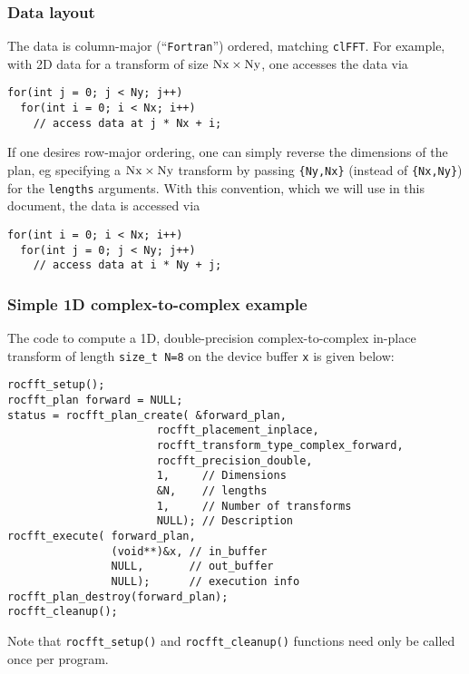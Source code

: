 \documentclass[10pt]{article}
\renewcommand{\(}{\left(}
\renewcommand{\)}{\right)}
\begin{document}
\subsubsection{Data layout}
\label{ssdatalayout}
The data is column-major (``\texttt{Fortran}'') ordered, matching
\texttt{clFFT}.  For example, with 2D data for a transform of size
$\text{\lstinline{Nx}}\times\text{\lstinline{Ny}}$, one accesses the
data via
\begin{lstlisting}
for(int j = 0; j < Ny; j++)
  for(int i = 0; i < Nx; i++)
    // access data at j * Nx + i;
\end{lstlisting}
If one desires row-major ordering, one can simply reverse the
dimensions of the plan, eg specifying a
$\text{\lstinline{Nx}}\times\text{\lstinline{Ny}}$ transform by
passing \lstinline|{Ny,Nx}| (instead of \lstinline|{Nx,Ny}|) for the
\lstinline|lengths| arguments.  With this convention, which we will
use in this document, the data is accessed via 
\begin{lstlisting}
for(int i = 0; i < Nx; i++)
  for(int j = 0; j < Ny; j++)
    // access data at i * Ny + j;
\end{lstlisting}

\subsubsection{Simple 1D complex-to-complex example}
The code to compute a 1D, double-precision complex-to-complex in-place
transform of length \lstinline{size_t N=8} on the device buffer
\lstinline{x} is given below:
\begin{lstlisting}
rocfft_setup();
rocfft_plan forward = NULL;
status = rocfft_plan_create( &forward_plan,
                       rocfft_placement_inplace,
                       rocfft_transform_type_complex_forward,
                       rocfft_precision_double,
                       1,     // Dimensions
                       &N,    // lengths
                       1,     // Number of transforms
                       NULL); // Description
rocfft_execute( forward_plan,
                (void**)&x, // in_buffer
                NULL,       // out_buffer
                NULL);      // execution info
rocfft_plan_destroy(forward_plan);
rocfft_cleanup();
\end{lstlisting}
Note that \lstinline{rocfft_setup()} and \lstinline{rocfft_cleanup()}
functions need only be called once per program.
\end{document}
